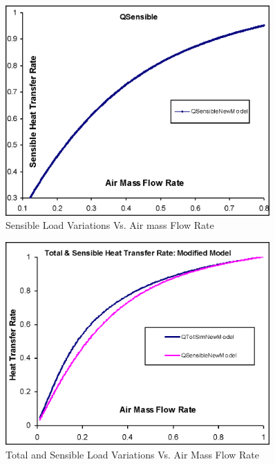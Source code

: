 \begin{figure}[hbtp] %
\centering
\includegraphics[width=0.9\textwidth, height=0.9\textheight, keepaspectratio=true]{media/image3349.png}
\caption{Sensible Load Variations Vs. Air mass Flow Rate \protect \label{fig:sensible-load-variations-vs-air-mass-flow}}
\end{figure}

\begin{figure}[hbtp] %
\centering
\includegraphics[width=0.9\textwidth, height=0.9\textheight, keepaspectratio=true]{media/image3350.png}
\caption{Total and Sensible Load Variations Vs. Air Mass Flow Rate \protect \label{fig:total-and-sensible-load-variations-vs-air}}
\end{figure}

